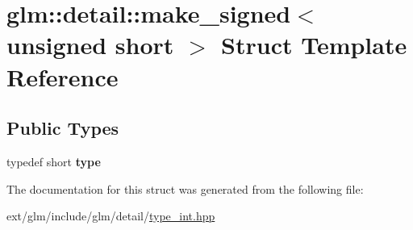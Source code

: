 \hypertarget{structglm_1_1detail_1_1make__signed_3_01unsigned_01short_01_4}{\section{glm\-:\-:detail\-:\-:make\-\_\-signed$<$ unsigned short $>$ Struct Template Reference}
\label{structglm_1_1detail_1_1make__signed_3_01unsigned_01short_01_4}
}
\subsection*{Public Types}
\begin{DoxyCompactItemize}
\item 
\hypertarget{structglm_1_1detail_1_1make__signed_3_01unsigned_01short_01_4_af5793ac48501a8fb2be1d5aa55afff67}{typedef short {\bfseries type}}\label{structglm_1_1detail_1_1make__signed_3_01unsigned_01short_01_4_af5793ac48501a8fb2be1d5aa55afff67}

\end{DoxyCompactItemize}


The documentation for this struct was generated from the following file\-:\begin{DoxyCompactItemize}
\item 
ext/glm/include/glm/detail/\hyperlink{type__int_8hpp}{type\-\_\-int.\-hpp}\end{DoxyCompactItemize}

